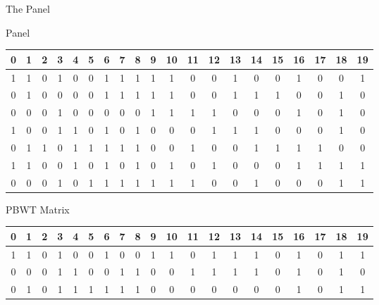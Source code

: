 \documentclass{beamer}
\begin{document}
\begin{frame}{The Panel}
  \begin{block}{Panel}
    \begin{table}[H]
      \centering
      \tiny
      \begin{tabular}{c|c|c|c|c|c|c|c|c|c|c|c|c|c|c|c|c|c|c|c}
        \hline
        0 & 1 & 2 & 3 & 4 & 5 & 6 & 7 & 8 & 9 & 10 & 11 & 12 & 13 & 14 & 15 & 16
        & 17 & 18 & 19\\
        \hline
        \hline
        
        1 & 1 & 0 & 1 & 0 & 0 & 1 & 1 & 1 & 1 & 1 & 0 & 0 & 1 & 0 & 0 & 1 & 0
             & 0 & 1\\
        0 & 1 & 0 & 0 & 0 & 0 & 1 & 1 & 1 & 1 & 1 & 0 & 0 & 1 & 1 & 1 & 0 & 0
             & 1 & 0\\
        0 & 0 & 0 & 1 & 0 & 0 & 0 & 0 & 0 & 1 & 1 & 1 & 1 & 0 & 0 & 0 & 1 & 0
             & 1 & 0\\
        1 & 0 & 0 & 1 & 1 & 0 & 1 & 0 & 1 & 0 & 0 & 0 & 1 & 1 & 1 & 0 & 0 & 0
             & 1 & 0\\
        0 & 1 & 1 & 0 & 1 & 1 & 1 & 1 & 1 & 0 & 0 & 1 & 0 & 0 & 1 & 1 & 1 & 1
             & 0 & 0\\
        1 & 1 & 0 & 0 & 1 & 0 & 1 & 0 & 1 & 0 & 1 & 0 & 1 & 0 & 0 & 0 & 1 & 1
             & 1 & 1\\
        0 & 0 & 0 & 1 & 0 & 1 & 1 & 1 & 1 & 1 & 1 & 1 & 0 & 0 & 1 & 0 & 0 & 0
             & 1 & 1\\
        \hline
      \end{tabular}
    \end{table}
  \end{block}
  \begin{block}{PBWT Matrix}
    \begin{table}[H]
      \centering
      \tiny
      \begin{tabular}{c|c|c|c|c|c|c|c|c|c|c|c|c|c|c|c|c|c|c|c}
        \hline
        0 & 1 & 2 & 3 & 4 & 5 & 6 & 7 & 8 & 9 & 10 & 11 & 12 & 13 & 14 & 15 & 16
        & 17 & 18 & 19\\
        \hline
        \hline
        1 & 1 & 0 & 1 & 0 & 0 & 1 & 0 & 0 & 1 & 1 & 0 & 1 & 1 & 1 & 0 & 1 & 0
             & 1 & 1 \\
        0 & 0 & 0 & 1 & 1 & 0 & 0 & 1 & 1 & 0 & 0 & 1 & 1 & 1 & 1 & 0 & 1 & 0
             & 1 & 0 \\
        0 & 1 & 0 & 1 & 1 & 1 & 1 & 1 & 1 & 0 & 0 & 0 & 0 & 0 & 0 & 0 & 1 & 0
             & 1 & 1 \\

\end{tabular}
\end{table}
\end{block}
\end{frame}
\end{document}
